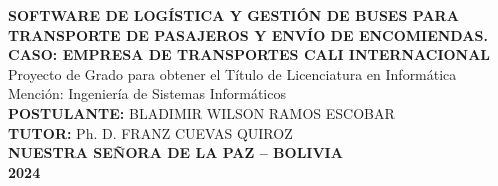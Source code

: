 \begin{titlepage}
\begin{center}
		{\textbf{SOFTWARE DE LOGÍSTICA Y GESTIÓN DE BUSES PARA TRANSPORTE DE PASAJEROS Y ENVÍO DE ENCOMIENDAS. CASO: EMPRESA DE TRANSPORTES CALI INTERNACIONAL}}\\
		{Proyecto de Grado para obtener el Título de Licenciatura en Informática}\\
		Mención: Ingeniería de Sistemas Informáticos\\
		
		\textbf{POSTULANTE:} BLADIMIR WILSON RAMOS ESCOBAR\\
		\textbf{TUTOR:} Ph. D. FRANZ CUEVAS QUIROZ\\
		\textbf{NUESTRA SEÑORA DE LA PAZ – BOLIVIA}\\
		\textbf{2024}\\
	\end{center}
\end{titlepage}